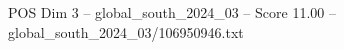 \begin{textsample}{POS Dim 3 – global\_south\_2024\_03 – Score 11.00 – global\_south\_2024\_03/106950946.txt}
\end{textsample}
